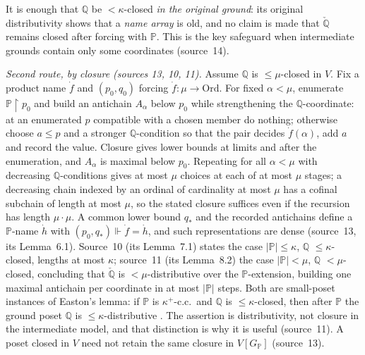 \documentclass[11pt,letterpaper]{article}
\numberwithin{equation}{section}
\theoremstyle{definition}
\theoremstyle{remark}
\newcommand{\Ord}{\mathrm{Ord}}
\newcommand{\res}{\mathbin{\upharpoonright}}
\newcommand{\abs}[1]{\lvert#1\rvert}
\newcommand{\forces}{\Vdash}
\begin{document}
It is enough that $\mathbb Q$ be $<\kappa$-closed \emph{in the original ground}: its
original distributivity shows that a \emph{name array} is old, and no claim is made
that $\check{\mathbb Q}$ remains closed after forcing with $\mathbb P$. This is the key
safeguard when intermediate grounds contain only some coordinates (source~14).

\emph{Second route, by closure (sources 13, 10, 11).} Assume $\mathbb Q$ is
$\le\mu$-closed in $V$. Fix a product name $\dot f$ and $(p_0,q_0)$ forcing
$\dot f:\mu\to\Ord$. For fixed $\alpha<\mu$, enumerate $\mathbb P\res p_0$ and build an
antichain $A_\alpha$ below $p_0$ while strengthening the $\mathbb Q$-coordinate: at an
enumerated $p$ compatible with a chosen member do nothing; otherwise choose $a\le p$
and a stronger $\mathbb Q$-condition so that the pair decides $\dot f(\alpha)$, add
$a$ and record the value. Closure gives lower bounds at limits and after the
enumeration, and $A_\alpha$ is maximal below $p_0$. Repeating for all $\alpha<\mu$ with
decreasing $\mathbb Q$-conditions gives at most $\mu$ choices at each of at most $\mu$
stages; a decreasing chain indexed by an ordinal of cardinality at most $\mu$ has a
cofinal subchain of length at most $\mu$, so the stated closure suffices even if the
recursion has length $\mu\cdot\mu$. A common lower bound $q_*$ and the recorded
antichains define a $\mathbb P$-name $\dot h$ with $(p_0,q_*)\forces\dot f=\dot h$,
and such representations are dense (source~13, its Lemma~6.1). Source~10 (its
Lemma~7.1) states the case $\abs{\mathbb P}\le\kappa$, $\mathbb Q$ $\le\kappa$-closed,
lengths at most $\kappa$; source~11 (its Lemma~8.2) the case $\abs{\mathbb
P}<\mu$, $\mathbb Q$ $<\mu$-closed, concluding that $\check{\mathbb Q}$ is
$<\mu$-distributive over the $\mathbb P$-extension, building one maximal antichain per
coordinate in at most $\abs{\mathbb P}$ steps. Both are small-poset instances of
Easton's lemma: if $\mathbb P$ is $\kappa^+$-c.c.\ and $\mathbb Q$ is $\le\kappa$-closed,
then after $\mathbb P$ the ground poset $\mathbb Q$ is $\le\kappa$-distributive
\cite[Lemma~3.8]{CodyGitman}. The assertion is distributivity, not closure in the
intermediate model, and that distinction is why it is useful (source~11). A poset
closed in $V$ need not retain the same closure in $V[G_{\mathbb P}]$ (source~13).
\end{document}
